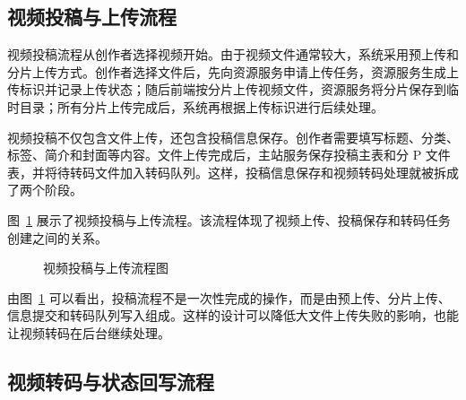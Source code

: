 \subsection{视频投稿与上传流程}
\label{subsec:video-post-upload-process}

视频投稿流程从创作者选择视频开始。由于视频文件通常较大，系统采用预上传和分片上传方式。创作者选择文件后，先向资源服务申请上传任务，资源服务生成上传标识并记录上传状态；随后前端按分片上传视频文件，资源服务将分片保存到临时目录；所有分片上传完成后，系统再根据上传标识进行后续处理。

视频投稿不仅包含文件上传，还包含投稿信息保存。创作者需要填写标题、分类、标签、简介和封面等内容。文件上传完成后，主站服务保存投稿主表和分 P 文件表，并将待转码文件加入转码队列。这样，投稿信息保存和视频转码处理就被拆成了两个阶段。

图~\ref{fig:video-post-upload-flow} 展示了视频投稿与上传流程。该流程体现了视频上传、投稿保存和转码任务创建之间的关系。

\begin{figure}[htbp]
  \centering
  \caption{视频投稿与上传流程图}
  \label{fig:video-post-upload-flow}
\end{figure}

由图~\ref{fig:video-post-upload-flow} 可以看出，投稿流程不是一次性完成的操作，而是由预上传、分片上传、信息提交和转码队列写入组成。这样的设计可以降低大文件上传失败的影响，也能让视频转码在后台继续处理。

\subsection{视频转码与状态回写流程}
\label{subsec:video-transcode-status-process}


